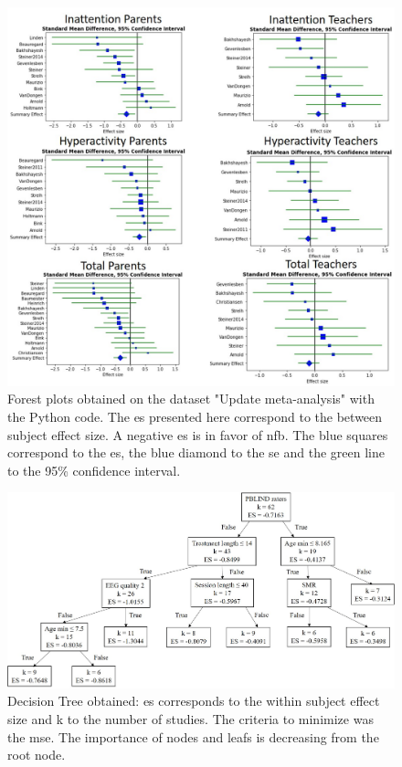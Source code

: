 \documentclass[12pt,a4paper,english]{article}
\begin{document}
\begin{figure}[h!]
  \centering
  \includegraphics[width=1.0\linewidth]{figures/meta_review_forest_plots_update_meta_analysis_our_choices_no_colors_2-columns_fitting_image.jpg}
  \caption{Forest plots obtained on the dataset "Update meta-analysis" with the Python code. The \gls{es} presented here correspond to
	the between subject effect size. A negative \gls{es} is in favor of \gls{nfb}. 
	The blue squares correspond to the \gls{es}, the blue diamond to the \gls{se} and the green line to the 95\% confidence interval.}
  \label{Figure:meta_review_forest_plots_update_meta_analysis_our_choices_no_colors_2-columns_fitting_image}
\end{figure}

\begin{figure}[h!]
  \centering
  \includegraphics[width=1.0\linewidth]{figures/factors_analysis_decision_tree_results_no_colors_2-columns_fitting_image.jpg}
  \caption{Decision Tree obtained: \gls{es} corresponds to the within subject effect size and k to the number of studies. 
	The criteria to minimize was the \gls{mse}. The importance of nodes and leafs is decreasing
	from the root node.}
  \label{Figure:factors_analysis_decision_tree_results}
\end{figure}
\end{document}
